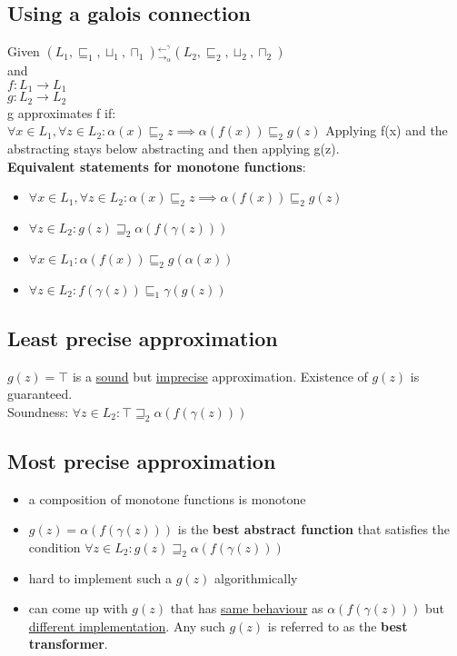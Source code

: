 \subsection{Using a galois connection}
Given $(L_1,\sqsubseteq_1,\sqcup_1,\sqcap_1) {}_{\to_{\alpha}}^ {\gets^{\gamma}} (L_2,\sqsubseteq_2,\sqcup_2,\sqcap_2)$ \\ 
and \\
$f:L_1 \to L_1$ \\
$g:L_2 \to L_2$ \\
g approximates f if:\\
$\forall x \in L_1, \forall z \in L_2: \alpha(x) \sqsubseteq_2 z \implies \alpha(f(x)) \sqsubseteq_2 g(z)$
Applying f(x) and the abstracting stays below abstracting and then applying g(z).\\
\textbf{Equivalent statements for monotone functions}:
\begin{itemize}
\item $\forall x \in L_1, \forall z \in L_2: \alpha(x) \sqsubseteq_2 z \implies \alpha(f(x)) \sqsubseteq_2 g(z)$
\item $\forall z \in L_2: g(z) \sqsupseteq_2 \alpha(f(\gamma(z)))$
\item $\forall x \in L_1: \alpha(f(x)) \sqsubseteq_2 g(\alpha(x))$
\item $\forall z \in L_2: f(\gamma(z)) \sqsubseteq_1 \gamma(g(z))$
\end{itemize}
\subsection{Least precise approximation}
$g(z)=\top$ is a \underline{sound} but \underline{imprecise} approximation. Existence of $g(z)$ is guaranteed. \\
Soundness: $\forall z \in L_2: \top \sqsupseteq_2 \alpha(f(\gamma(z)))$
\subsection{Most precise approximation}
\begin{itemize}
\item a composition of monotone functions is monotone
\item $g(z) = \alpha(f(\gamma(z)))$ is the \textbf{best abstract function} that satisfies the condition $\forall z \in L_2: g(z) \sqsupseteq_2 \alpha(f(\gamma(z)))$
\item hard to implement such a $g(z)$ algorithmically
\item can come up with $g(z)$ that has \underline{same behaviour} as $\alpha(f(\gamma(z)))$ but \underline{different implementation}. Any such $g(z)$ is referred to as the \textbf{best transformer}.
\end{itemize}
